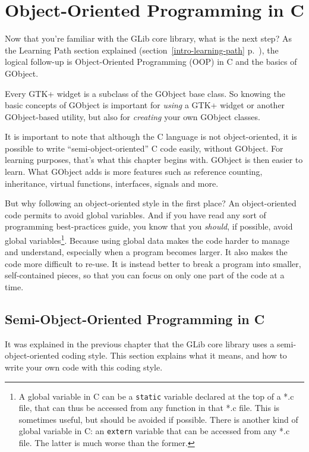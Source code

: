\part{Object-Oriented Programming in C}
\label{oop}

Now that you're familiar with the GLib core library, what is the next step? As the Learning Path section explained (section~\ref{intro-learning-path} p.~\pageref{intro-learning-path}), the logical follow-up is Object-Oriented Programming (OOP) in C and the basics of GObject.

Every GTK+ widget is a subclass of the GObject base class. So knowing the basic concepts of GObject is important for \emph{using} a GTK+ widget or another GObject-based utility, but also for \emph{creating} your own GObject classes.

It is important to note that although the C language is not object-oriented, it is possible to write ``semi-object-oriented'' C code easily, without GObject. For learning purposes, that's what this chapter begins with. GObject is then easier to learn. What GObject adds is more features such as reference counting, inheritance, virtual functions, interfaces, signals and more.

But why following an object-oriented style in the first place? An object-oriented code permits to avoid global variables. And if you have read any sort of programming best-practices guide, you know that you \emph{should}, if possible, avoid global variables\footnote{A global variable in C can be a \lstinline{static} variable declared at the top of a *.c file, that can thus be accessed from any function in that *.c file. This is sometimes useful, but should be avoided if possible. There is another kind of global variable in C: an \lstinline{extern} variable that can be accessed from any *.c file. The latter is much worse than the former.}. Because using global data makes the code harder to manage and understand, especially when a program becomes larger. It also makes the code more difficult to re-use. It is instead better to break a program into smaller, self-contained pieces, so that you can focus on only one part of the code at a time.

\chapter{Semi-Object-Oriented Programming in C}

It was explained in the previous chapter that the GLib core library uses a semi-object-oriented coding style. This section explains what it means, and how to write your own code with this coding style.

